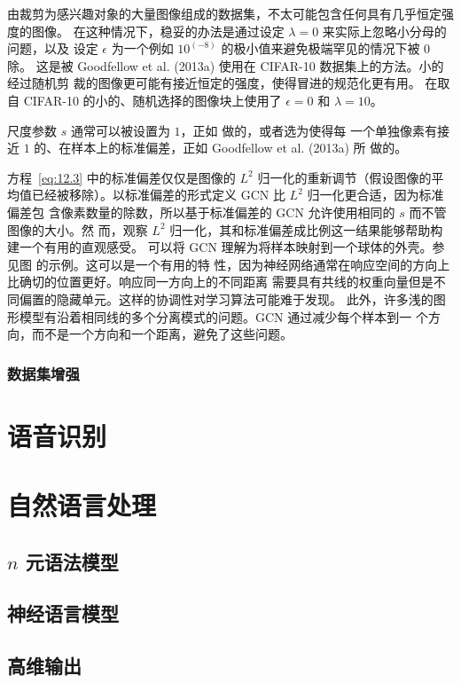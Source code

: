 由裁剪为感兴趣对象的大量图像组成的数据集，不太可能包含任何具有几乎恒定强度的图像。
在这种情况下，稳妥的办法是通过设定 $\lambda = 0$ 来实际上忽略小分母的问题，以及
设定 $\epsilon$ 为一个例如 $10^{(-8)}$ 的极小值来避免极端罕见的情况下被 $0$ 除。
这是被 Goodfellow et al. (2013a) 使用在 CIFAR-10 数据集上的方法。小的经过随机剪
裁的图像更可能有接近恒定的强度，使得冒进的规范化更有用。\citet{Coates2011} 在取
自 CIFAR-10 的小的、随机选择的图像块上使用了 $\epsilon = 0$ 和 $\lambda = 10$。

尺度参数 $s$ 通常可以被设置为 $1$，正如 \citet{Coates2011} 做的，或者选为使得每
一个单独像素有接近 $1$ 的、在样本上的标准偏差，正如 Goodfellow et al. (2013a) 所
做的。

方程~\ref{eq:12.3} 中的标准偏差仅仅是图像的 $L^2$ 归一化的重新调节（假设图像的平
均值已经被移除）。以标准偏差的形式定义 GCN 比 $L^2$ 归一化更合适，因为标准偏差包
含像素数量的除数，所以基于标准偏差的 GCN 允许使用相同的 $s$ 而不管图像的大小。然
而，观察 $L^2$ 归一化，其和标准偏差成比例这一结果能够帮助构建一个有用的直观感受。
可以将 GCN 理解为将样本映射到一个球体的外壳。参见图 的示例。这可以是一个有用的特
性，因为神经网络通常在响应空间的方向上比确切的位置更好。响应同一方向上的不同距离
需要具有共线的权重向量但是不同偏置的隐藏单元。这样的协调性对学习算法可能难于发现。
此外，许多浅的图形模型有沿着相同线的多个分离模式的问题。GCN 通过减少每个样本到一
个方向，而不是一个方向和一个距离，避免了这些问题。

\subsubsection{数据集增强}
\label{subsubsec:dataset_augmentation}

\section{语音识别}
\label{sec:speech_recognition}

\section{自然语言处理}
\label{sec:natural_language_processing}

\subsection{$n$ 元语法模型}
\label{subsec:ngrams}

\subsection{神经语言模型}
\label{subsec:neural_language_models}

\subsection{高维输出}
\label{high_dimentional_outputs}

